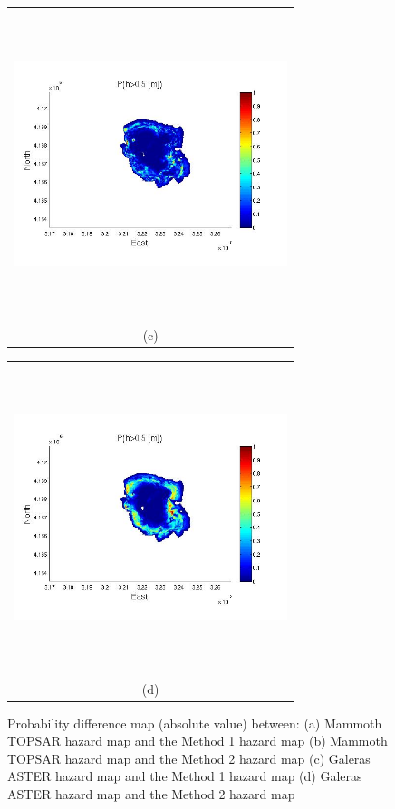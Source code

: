 \documentclass[12pt]{article}
\newcommand{\Pic}[2][0.85]{\begin{center}\texttt{[image: \#2]}
 \end{center} }
\begin{document}
\begin{figure}[H]
\begin{minipage}{0.6\textwidth}
\begin{tabular}{c}
        \end{tabular}
    \end{minipage} 
    \begin{minipage}[b]{0.6\textwidth}
        \begin{tabular}{c}
       \includegraphics[width=8cm,height=9cm,keepaspectratio]{Mammoth0_minus_Topsar30.jpg}\\
        (c)
        \end{tabular}
    \end{minipage}
    \begin{minipage}{0.6\textwidth}
        \begin{tabular}{c}
	\includegraphics[width=8cm,height=9cm,keepaspectratio]{Mammoth3_minus_Topsar30.jpg}\\
        (d)
        \end{tabular}
    \end{minipage} 
    \caption{ Probability difference map (absolute value) between: (a)
      Mammoth TOPSAR hazard map and the Method 1 hazard map (b)
      Mammoth TOPSAR hazard map and the Method 2 hazard map (c)
      Galeras ASTER hazard map and the Method 1 hazard map (d) Galeras
      ASTER hazard map and the Method 2 hazard map}
\label{fig8}  
\end{figure}
\end{document}
